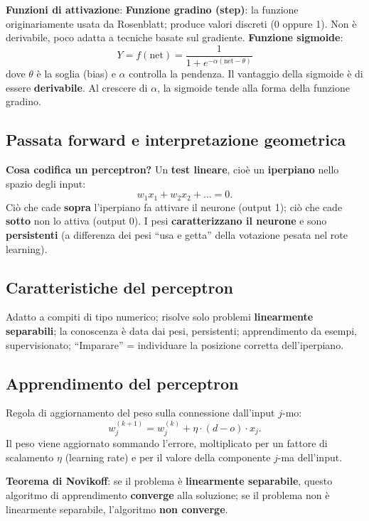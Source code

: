 \documentclass[11pt,a4paper]{report}
\begin{document}
\textbf{Funzioni di attivazione}: \textbf{Funzione gradino (step)}: la funzione originariamente usata da Rosenblatt; produce valori discreti (0 oppure 1). Non è derivabile, poco adatta a tecniche basate sul gradiente. \textbf{Funzione sigmoide}:
\[
Y = f(\text{net}) = \frac{1}{1+e^{-\alpha(\text{net}-\theta)}}
\]
dove $\theta$ è la soglia (bias) e $\alpha$ controlla la pendenza. Il vantaggio della sigmoide è di essere \textbf{derivabile}. Al crescere di $\alpha$, la sigmoide tende alla forma della funzione gradino.

\subsection*{Passata forward e interpretazione geometrica}

\textbf{Cosa codifica un perceptron?} Un \textbf{test lineare}, cioè un \textbf{iperpiano} nello spazio degli input:
\[
w_1 x_1 + w_2 x_2 + \dots = 0.
\]
Ciò che cade \textbf{sopra} l'iperpiano fa attivare il neurone (output 1); ciò che cade \textbf{sotto} non lo attiva (output 0). I pesi \textbf{caratterizzano il neurone} e sono \textbf{persistenti} (a differenza dei pesi ``usa e getta'' della votazione pesata nel rote learning).

\subsection*{Caratteristiche del perceptron}

Adatto a compiti di tipo numerico; risolve solo problemi \textbf{linearmente separabili}; la conoscenza è data dai pesi, persistenti; apprendimento da esempi, supervisionato; ``Imparare'' = individuare la posizione corretta dell'iperpiano.

\subsection*{Apprendimento del perceptron}

Regola di aggiornamento del peso sulla connessione dall'input $j$-mo:
\[
w_j^{(k+1)} = w_j^{(k)} + \eta \cdot (d-o) \cdot x_j.
\]
Il peso viene aggiornato sommando l'errore, moltiplicato per un fattore di scalamento $\eta$ (learning rate) e per il valore della componente $j$-ma dell'input.

\textbf{Teorema di Novikoff}: se il problema è \textbf{linearmente separabile}, questo algoritmo di apprendimento \textbf{converge} alla soluzione; se il problema non è linearmente separabile, l'algoritmo \textbf{non converge}.
\end{document}
